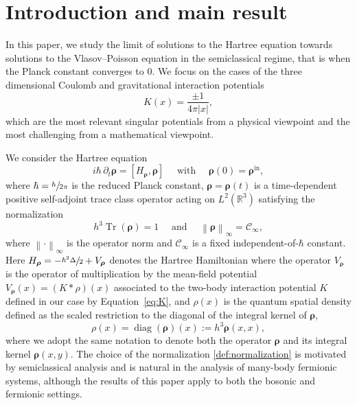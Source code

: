 \documentclass[11pt]{article}
\theoremstyle{definition}
\newcommand {\RR} {\mathbb R}
\newcommand {\Rd} {\RR^3}
\let\lt\left
\let\rt\right
\renewcommand {\(} {\lt(}
\renewcommand {\)} {\rt)}
\newcommand {\com}[1] {\lt[{#1}\rt]}
\newcommand {\n}[1] {\lt\lvert #1 \rt\rvert}
\newcommand {\nrm}[1] {\lt\lVert #1\rt\rVert}
\newcommand {\Nrm}[2] {\nrm{#1}_{#2}}
\newcommand {\dpt} {\partial_t}
\DeclareMathOperator{\tr} {Tr}
\DeclareMathOperator{\diag} {diag}
\newcommand {\Tr}[1] {\tr\!\( #1 \)}
\newcommand {\init} {\mathrm{in}}
\newcommand {\cC} {\mathcal{C}}
\newcommand {\op} {\boldsymbol{\rho}}
\begin{document}

\vspace*{-4\baselineskip}\mbox{}
\section{Introduction and main result}

In this paper, we study the limit of solutions to the Hartree equation towards solutions to the Vlasov--Poisson equation in the semiclassical regime, that is when the Planck constant converges to $0$. We focus on the cases of the three dimensional Coulomb and gravitational interaction potentials
\begin{equation}\label{eq:K}
K(x) = \frac{\pm 1}{4\pi\n{x}},
\end{equation}
which are the most relevant singular potentials from a physical viewpoint and the most challenging from a mathematical viewpoint.

We consider the Hartree equation
\begin{equation}\label{eq:Hartree}
i\hbar\,\dpt \op = \com{H_{\op},\op} \quad \text{ with } \quad \op(0)= \op^{\init},
\end{equation}
where $\hbar=\sfrac{h}{2\pi}$ is the reduced Planck constant, $\op = \op(t)$ is a time-dependent positive self-adjoint trace class operator acting on $L^2(\Rd)$ satisfying the normalization
\begin{equation}\label{def:normalization}
h^3\Tr{\op}=1\quad \text{ and } \quad \Nrm{\op}{\infty}=\cC_\infty,
\end{equation}
where $\Nrm{\cdot}{\infty}$ is the operator norm and $\cC_\infty$ is a fixed independent-of-$\hbar$ constant.
Here $H_{\op} = -\sfrac{\hbar^2\Delta}{2} + V_{\op}$ denotes the Hartree Hamiltonian where the operator $V_{\op}$ is the operator of multiplication by the mean-field potential $V_{\op}(x) = (K*\rho)(x)$ associated to the two-body interaction potential $K$ defined in our case by Equation~\eqref{eq:K}, and $\rho(x)$ is the quantum spatial density defined as the scaled restriction to the diagonal of the integral kernel of $\op$,
\begin{equation*}
\rho(x)=\diag(\op)(x) := h^3\op(x,x),
\end{equation*}
where we adopt the same notation to denote both the operator $\op$ and its integral kernel $\op(x,y)$. The choice of the normalization \eqref{def:normalization} is motivated by semiclassical analysis and is natural in the analysis of many-body fermionic systems, although the results of this paper apply to both the bosonic and fermionic settings.
\end{document}
